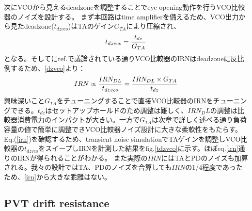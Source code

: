 \documentclass[letterpaper, 10 pt, conference]{ieeeconf}  %
\begin{document}
次にVCOから見えるdeadzoneを調整することでeye-opening動作を行うVCO比較器のノイズを設計する。
まず本回路はtime amplifierを備えるため、VCO出力から見たdeadzone($t_{dzvco}$)はTAのゲイン$G_{TA}$により圧縮され、
\begin{eqnarray}
    \centering
    t_{dzvco} = \frac{t_{dz}}{G_{TA}}
    \label{dzvco}
\end{eqnarray}
となる。そしてにref.\cite{luo2020input, ding20190}で議論されている通りVCO比較器のIRNはdeadzoneに反比例するため、\ref{dzvco}より：
\begin{eqnarray}
    \centering
    IRN \propto \frac{IRN_{DL}}{t_{dzvco}} = \frac{IRN_{DL}\times G_{TA}}{t_{dz}}
    \label{irn}
\end{eqnarray}
興味深いこと$G_{TA}$をチューニングすることで直接VCO比較器のIRNをチューニングできる。$t_{dz}$はセットアップホールドのため調整は難しく、$IRN_DL$の調整は比較器消費電力のインパクトが大きい。一方で$G_{TA}$は次章で詳しく述べる通り負荷容量の値で簡単に調整できVCO比較器ノイズ設計に大きな柔軟性をもたらす。Eq.(\ref{irn})を確認するため、transient noise simulationでTAゲインを調整しVCO比較器の$t_{dzvco}$をスイープしIRNを計測した結果をfig.\ref{tdzvco}に示す。ほぼeq.\ref{irn}通りのIRNが得られることがわかる。
また実際の$IRN$にはTAとPDのノイズも加算される。我々の設計ではTA、PDのノイズを合算しても$IRN$の1/4程度であったため、\ref{irn}から大きな乖離はない。


\subsection{PVT drift resistance}

\end{document}
